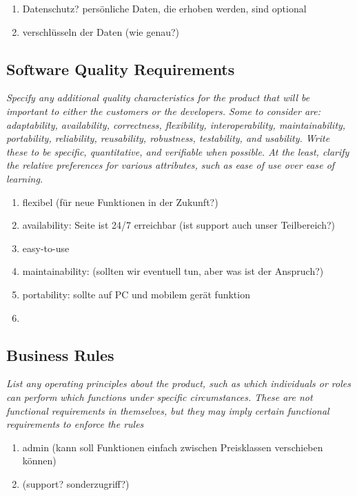 \begin{enumerate}
    \item Datenschutz? persönliche Daten, die erhoben werden, sind optional
    \item verschlüsseln der Daten (wie genau?)
\end{enumerate}


\subsection{Software Quality Requirements}
\textit{Specify any additional quality characteristics for the product that will be important to either the customers or
the developers.
Some to consider are: adaptability, availability, correctness, flexibility, 
interoperability, maintainability, portability, reliability, reusability, 
robustness, testability, and usability. Write these to be specific, quantitative, 
and verifiable when possible.
At the least, clarify the relative preferences for various attributes, 
such as ease of use over ease of learning.}

\begin{enumerate}
    \item flexibel (für neue Funktionen in der Zukunft?)
    \item availability: Seite ist 24/7 erreichbar (ist support auch unser Teilbereich?)
    \item easy-to-use
    \item maintainability: (sollten wir eventuell tun, aber was ist der Anspruch?)
    \item portability: sollte auf PC und mobilem gerät funktion
    \item
\end{enumerate}

\subsection{Business Rules}
\textit{List any operating principles about the product, 
such as which individuals or roles can perform which functions under specific circumstances. 
These are not functional requirements in themselves, 
but they may imply certain functional requirements to enforce the rules}

\begin{enumerate}
    \item admin (kann soll Funktionen einfach zwischen Preisklassen verschieben können)
    \item (support? sonderzugriff?)
\end{enumerate}
